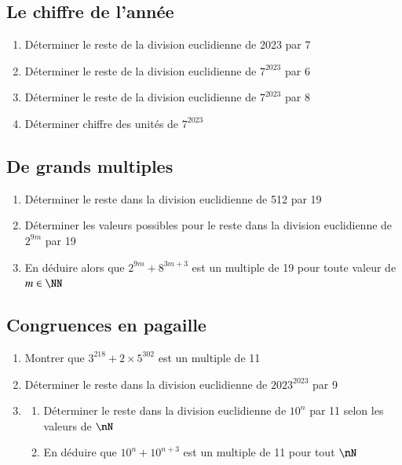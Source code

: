 \documentclass[oneside,12pt]{article}          %
\begin{document}
\subsection{Le chiffre de l'année}
\begin{enumerate}
    \item Déterminer le reste de la division euclidienne de 2023 par 7
    \item Déterminer le reste de la division euclidienne de $7^{2023}$ par 6
    \item Déterminer le reste de la division euclidienne de $7^{2023}$ par 8
    \item Déterminer chiffre des unités de $7^{2023}$
\end{enumerate}



\subsection{De grands multiples}
\begin{enumerate}
    \item Déterminer le reste dans la division euclidienne de 512 par 19
    \item Déterminer les valeurs possibles pour le reste dans la division euclidienne de $2^{9m}$ par 19
    \item En déduire alors que $2^{9m}+8^{3m+3}$ est un multiple de 19 pour toute valeur de $m\in\NN$
\end{enumerate}



\subsection{Congruences en pagaille}
\begin{enumerate}
    \item Montrer que $3^{218}+2\times5^{302}$ est un multiple de 11
    \item Déterminer le reste dans la division euclidienne de $2023^{2023}$ par 9
    \item \begin{enumerate}
        \item Déterminer le reste dans la division euclidienne de $10^n$ par 11 selon les valeurs de $\nN$
        \item En déduire que $10^n+10^{n+3}$ est un multiple de 11 pour tout $\nN$
    \end{enumerate}
\end{enumerate}
\end{document}
